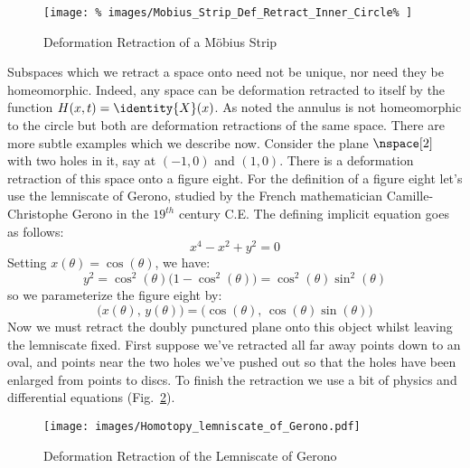         \begin{figure}[H]
            \centering
            \captionsetup{type=figure}
            \texttt{[image: \%
                images/Mobius\_Strip\_Def\_Retract\_Inner\_Circle\%
            ]}
            \caption{Deformation Retraction of a M\"{o}bius Strip}
            \label{fig:Def_Retract_Mobius_Strip}
        \end{figure}
        Subspaces which we retract a space onto need not be unique, nor
        need they be homeomorphic. Indeed, any space can be deformation
        retracted to itself by the function $H(x,t)=\identity{X}(x)$.
        As noted the annulus is not homeomorphic to the circle but both
        are deformation retractions of the same space. There are more
        subtle examples which we describe now. Consider the plane
        $\nspace[2]$ with two holes in it, say at $(\minus{1},0)$ and
        $(1,0)$. There is a deformation retraction of this space onto a
        figure eight. For the definition of a figure eight let's use the
        lemniscate of Gerono, studied by the French mathematician
        Camille-Christophe Gerono in the $19^{th}$ century C.E. The
        defining implicit equation goes as follows:
        \begin{equation}
            x^{4}-x^{2}+y^{2}=0
        \end{equation}
        Setting $x(\theta)=\cos(\theta)$, we have:
        \begin{equation}
            y^{2}=\cos^{2}(\theta)\big(1-\cos^{2}(\theta)\big)
                 =\cos^{2}(\theta)\sin^{2}(\theta)
        \end{equation}
        so we parameterize the figure eight by:
        \begin{equation}
            \big(x(\theta),\,y(\theta)\big)
                =\big(\cos(\theta),\,\cos(\theta)\sin(\theta)\big)
        \end{equation}
        Now we must retract the doubly punctured plane onto this object
        whilst leaving the lemniscate fixed. First suppose we've
        retracted all far away points down to an oval, and points near
        the two holes we've pushed out so that the holes have been
        enlarged from points to discs. To finish the retraction we use a
        bit of physics and differential equations
        (Fig.~\ref{fig:Deformation_Retraction_lemniscate_of_Gerono}).
        \begin{figure}
            \centering
            \captionsetup{type=figure}
            \texttt{[image: images/Homotopy\_lemniscate\_of\_Gerono.pdf]}
            \caption{Deformation Retraction of the Lemniscate of Gerono}
            \label{fig:Deformation_Retraction_lemniscate_of_Gerono}
        \end{figure}
